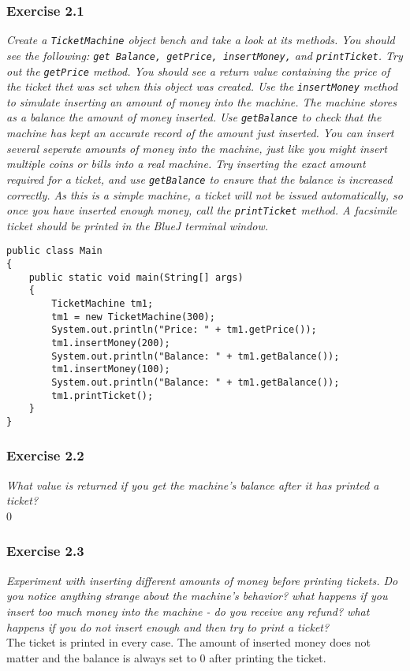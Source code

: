 \subsubsection*{Exercise 2.1}
\textit{Create a \lstinline{TicketMachine} object bench and take a look at its 
methods. You should see the following: 
\lstinline{get Balance, getPrice, insertMoney,} and \lstinline{printTicket}. Try out the 
\lstinline{getPrice} method. You should see a return value containing the price of 
the ticket thet was set when this object was created. Use the 
\lstinline{insertMoney} method to simulate inserting an amount of money into the 
machine. The machine stores as a balance the amount of money inserted. Use 
\lstinline{getBalance} to check that the machine has kept an accurate record of the 
amount just inserted. You can insert several seperate amounts of money into the 
machine, just like you might insert multiple coins or bills into a real 
machine. Try inserting the exact amount required for a ticket, and use 
\lstinline{getBalance} to ensure that the balance is increased correctly. As this 
is a simple machine, a ticket will not be issued automatically, so once you 
have inserted enough money, call the \lstinline{printTicket} method. A facsimile 
ticket should be printed in the BlueJ terminal window. }\\
\begin{lstlisting}[caption=Solution for Exercise 2.1 in Eclipse]
public class Main
{
	public static void main(String[] args)
	{
		TicketMachine tm1;
		tm1 = new TicketMachine(300);
		System.out.println("Price: " + tm1.getPrice());
		tm1.insertMoney(200);
		System.out.println("Balance: " + tm1.getBalance());
		tm1.insertMoney(100);
		System.out.println("Balance: " + tm1.getBalance());
		tm1.printTicket();
	}
}
\end{lstlisting}

\subsubsection*{Exercise 2.2}
\textit{What value is returned if you get the machine's balance after it has 
printed a ticket? }\\
0

\subsubsection*{Exercise 2.3}
\textit{Experiment with inserting different amounts of money before printing 
tickets. Do you notice anything strange about the machine's behavior? what 
happens if you insert too much money into the machine - do you receive any 
refund? what happens if you do not insert enough and then try to print a 
ticket? }\\
The ticket is printed in every case. The amount of inserted money does not 
matter and the balance is always set to 0 after printing the ticket. 

